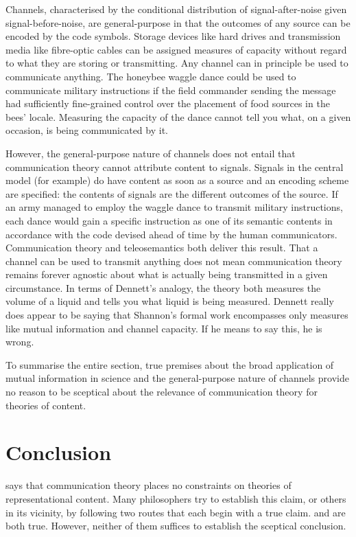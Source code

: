 \documentclass[12pt]{article}
\begin{document}
\noindent Channels, characterised by the conditional distribution of signal-after-noise given signal-before-noise, are general-purpose in that the outcomes of any source can be encoded by the code symbols.
Storage devices like hard drives and transmission media like fibre-optic cables can be assigned measures of capacity without regard to what they are storing or transmitting.
Any channel can in principle be used to communicate anything.
The honeybee waggle dance could be used to communicate military instructions if the field commander sending the message had sufficiently fine-grained control over the placement of food sources in the bees' locale.
Measuring the capacity of the dance cannot tell you what, on a given occasion, is being communicated by it.

However, the general-purpose nature of channels does not entail that communication theory cannot attribute content to signals.
Signals in the central model (for example) do have content as soon as a source and an encoding scheme are specified: the contents of signals are the different outcomes of the source.
If an army managed to employ the waggle dance to transmit military instructions, each dance would gain a specific instruction as one of its semantic contents in accordance with the code devised ahead of time by the human communicators.
Communication theory and teleosemantics both deliver this result.
That a channel can be used to transmit anything does not mean communication theory remains forever agnostic about what is actually being transmitted in a given circumstance.
In terms of Dennett's analogy, the theory both measures the volume of a liquid and tells you what liquid is being measured.
Dennett really does appear to be saying that Shannon's formal work encompasses only measures like mutual information and channel capacity.
If he means to say this, he is wrong.

To summarise the entire section, true premises about the broad application of mutual information in science and the general-purpose nature of channels provide no reason to be sceptical about the relevance of communication theory for theories of content.

\section{Conclusion}\label{sec:conclusion}

\tic{} says that communication theory places no constraints on theories of representational content.
Many philosophers try to establish this claim, or others in its vicinity, by following two routes that each begin with a true claim.
\sw{} and \ami{} are both true.
However, neither of them suffices to establish the sceptical conclusion.
\end{document}
